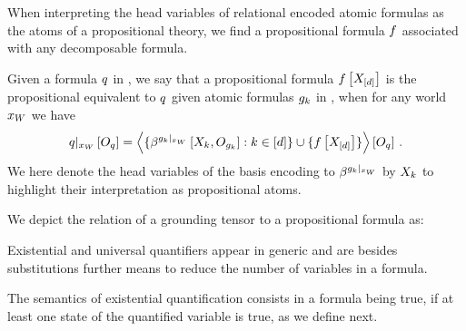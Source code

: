 When interpreting the head variables of relational encoded atomic formulas as the atoms of a propositional theory, we find a propositional formula $f$ associated with any decomposable \firstOrderLogic{} formula.

\begin{definition}
    \label{def:propositionalEquivalent}
    Given a formula $q$ in \firstOrderLogic{}, we say that a propositional formula $f\left[X_{[d]}\right]$ is the propositional equivalent to $q$ given atomic formulas $g_{k}$ in \firstOrderLogic{}, when for any world $x_{W}$ we have
    \begin{align*}
        {q}|_{x_{W}} \left[O_{q}\right]
        = \left\langle 
            \{\beta^{{g_{k}}|_{x_{W}}}\left[X_{k},O_{g_{k}}\right] : k\in[d]\}
            \cup \{f\left[X_{[d]}\right]\}
        \right\rangle \left[ O_{q} \right] \, .
    \end{align*}
    We here denote the head variables of the basis encoding to $\beta^{{g_{k}}|_{x_{W}}}$ by $X_{k}$ to highlight their interpretation as propositional atoms.
\end{definition}

We depict the relation of a grounding tensor to a propositional formula as:
\begin{center}
    
\end{center}



Existential and universal quantifiers appear in generic \firstOrderLogic{} and are besides substitutions further means to reduce the number of variables in a formula.


The semantics of existential quantification consists in a formula being true, if at least one state of the quantified variable is true, as we define next.

